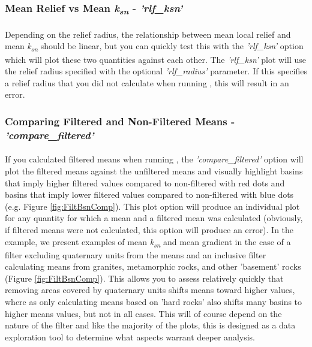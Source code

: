\subsubsection{Mean Relief vs Mean \textit{k\textsubscript{sn}} - \textit{'rlf\_ksn'}} \label{sec:rlfksn}
\paragraph{}Depending on the relief radius, the relationship between mean local relief and mean \textit{k\textsubscript{sn}} should be linear, but you can quickly test this with the \textit{'rlf\_ksn'} option which will plot these two quantities against each other. The \textit{'rlf\_ksn'} plot will use the relief radius specified with the optional \textit{'rlf\_radius'} parameter. If this specifies a relief radius that you did not calculate when running , this will result in an error. 

\subsubsection{Comparing Filtered and Non-Filtered Means - \textit{'compare\_filtered'}} \label{sec:compfilt}

\paragraph{}If you calculated filtered means when running , the \textit{'compare\_filtered'} option will plot the filtered means against the unfiltered means and visually highlight basins that imply higher filtered values compared to non-filtered with red dots and basins that imply lower filtered values compared to non-filtered with blue dots (e.g. Figure \ref{fig:FiltBsnComp}). This plot option will produce an individual plot for any quantity for which a mean and a filtered mean was calculated (obviously, if filtered means were not calculated, this option will produce an error). In the example, we present examples of mean \textit{k\textsubscript{sn}} and mean gradient in the case of a filter excluding quaternary units from the means and an inclusive filter calculating means from granites, metamorphic rocks, and other 'basement' rocks (Figure \ref{fig:FiltBsnComp}). This allows you to assess relatively quickly that removing areas covered by quaternary units shifts means toward higher values, where as only calculating means based on 'hard rocks' also shifts many basins to higher means values, but not in all cases. This will of course depend on the nature of the filter and like the majority of the plots, this is designed as a data exploration tool to determine what aspects warrant deeper analysis.

